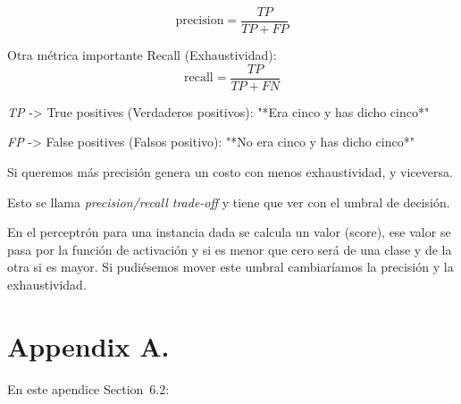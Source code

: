\documentclass[twoside,11pt]{article}
\begin{document}
$$
\mathrm{precision} = \frac{TP}{TP + FP}
$$

Otra métrica importante Recall (Exhaustividad):
$$
\mathrm{recall} = \frac{TP}{TP + FN}
$$

\textit{TP} -> True positives (Verdaderos positivos): "*Era cinco y has dicho cinco*"

\textit{FP} -> False positives (Falsos positivo): "*No era cinco y has dicho cinco*"

Si queremos más precisión genera un costo con menos exhaustividad, y viceversa.

Esto se llama \textit{precision/recall trade-off} y tiene que ver con el umbral de decisión. 

En el perceptrón para una instancia dada se calcula un valor (score), ese valor se pasa por 
la función de activación y si es menor que cero será de una clase y de la otra si es mayor. 
Si pudiésemos mover este umbral cambiaríamos la precisión y la exhaustividad.




\newpage

\appendix
\section*{Appendix A.}
\label{app:theorem}



En este apendice
Section~6.2:

\noindent

\vskip 0.2in

\end{document}
